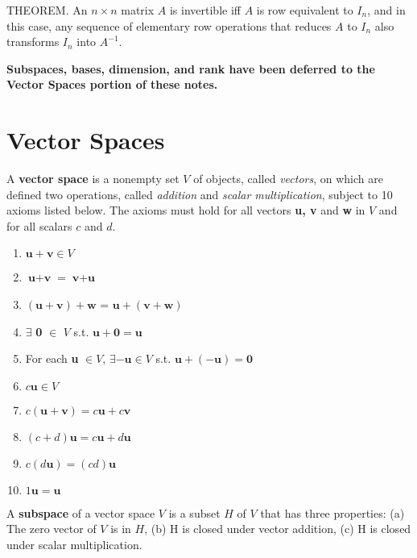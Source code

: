 \documentclass{article}
\begin{document}
\hfill \newline THEOREM. An $n \times n$ matrix $A$ is invertible iff $A$ is row equivalent to $I_n$, and in this case, any sequence of elementary row operations that reduces $A$ to $I_n$ also transforms $I_n$ into $A^{-1}$.

\hfill \newline \textbf{Subspaces, bases, dimension, and rank have been deferred to the Vector Spaces portion of these notes.}








\section{Vector Spaces}
A \textbf{vector space} is a nonempty set $V$ of objects, called \textit{vectors}, on which are defined two operations, called \textit{addition} and \textit{scalar multiplication}, subject to 10 axioms listed below. The axioms must hold for all vectors \textbf{u, v} and \textbf{w} in $V$ and for all scalars $c$ and $d$. 

\begin{enumerate}
    \item $\textbf{u}+\textbf{v} \in V$ 
    \item $\textbf{u}+\textbf{v}$ =  $\textbf{v}+\textbf{u}$
    \item $(\textbf{u}+\textbf{v})+\textbf{w}$ = $\textbf{u}+(\textbf{v}+\textbf{w})$
    \item $\exists$ \textbf{0} $\in$ $V$ s.t. $\textbf{u}+\textbf{0}=\textbf{u}$
    \item For each \textbf{u} $\in V$, $\exists -\textbf{u} \in V$ s.t. $\textbf{u}+(-\textbf{u})=\textbf{0}$ 
    \item $c\textbf{u} \in V$
    \item $c(\textbf{u} +\textbf{v})=c\textbf{u}+c\textbf{v}$
    \item $(c+d)\textbf{u}=c\textbf{u}+d\textbf{u}$
    \item $c(d\textbf{u}) = (cd)\textbf{u}$
    \item $1\textbf{u}=\textbf{u}$
\end{enumerate}

\noindent A \textbf{subspace} of a vector space $V$ is a subset $H$ of $V$ that has three properties: (a) The zero vector of $V$ is in $H$, (b) H is closed under vector addition, (c) H is closed under scalar multiplication.
\end{document}
